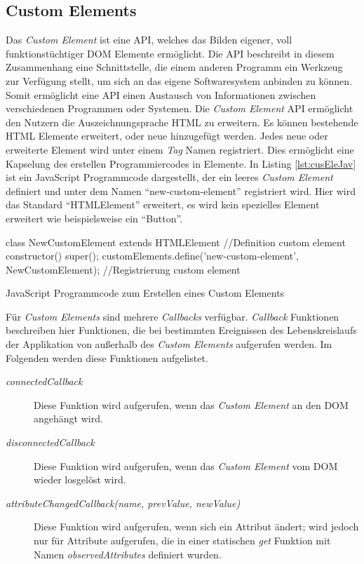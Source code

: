\documentclass[12pt, paper=a4, bibtotoc, toc=listof, headsepline=true]{scrreprt}
\begin{document}
		\subsection{Custom Elements}
		Das \emph{Custom Element} ist eine \ac{API}, welches das Bilden eigener, voll funktionstüchtiger \ac{DOM} Elemente ermöglicht\cite{Denicola2016}. Die \ac{API} beschreibt in diesem Zusammenhang eine Schnittstelle, die einem anderen Programm ein Werkzeug zur Verfügung stellt, um sich an das eigene Softwaresystem anbinden zu können\cite{Behrendt2016}. Somit ermöglicht eine \ac{API} einen Austausch von Informationen zwischen verschiedenen Programmen oder Systemen.	
		Die \emph{Custom Element} \ac{API} ermöglicht den Nutzern die Auszeichnungsprache \ac{HTML} zu erweitern\cite{Argelius2016}. Es können bestehende \ac{HTML} Elemente erweitert, oder neue hinzugefügt werden. Jedes neue oder erweiterte Element wird unter einem \emph{Tag} Namen registriert. Dies ermöglicht eine Kapselung des erstellen Programmiercodes in Elemente. In Listing \ref{lst:cusEleJav} ist ein JavaScript Programmcode dargestellt, der ein leeres \emph{Custom Element} definiert und unter dem Namen \enquote{new-custom-element} registriert wird. Hier wird das Standard \enquote{HTMLElement} erweitert, es wird kein spezielles Element erweitert wie beispielsweise ein \enquote{Button}.
		\begin{listing}
			\begin{JavaScriptcode*}{}
class NewCustomElement extends HTMLElement { //Definition custom element
	constructor() {
		super();
	}
}
customElements.define('new-custom-element', NewCustomElement); //Registrierung custom element
			\end{JavaScriptcode*}
			\caption[Erstellung Custom Element]{JavaScript Programmcode zum Erstellen eines Custom Elements}
			\label{lst:cusEleJav}
		\end{listing}
		Für \emph{Custom Elements} sind mehrere \emph{Callbacks} verfügbar. \emph{Callback} Funktionen beschreiben hier Funktionen, die bei bestimmten Ereignissen des Lebenskreislaufs der Applikation von außerhalb des \emph{Custom Elements} aufgerufen werden. Im Folgenden werden diese Funktionen aufgelistet\cite{Argelius2016}.
		\begin{description}  
			\item  [\emph{connectedCallback}] Diese Funktion wird aufgerufen, wenn das \emph{Custom Element} an den \ac{DOM} angehängt wird.			
			\item [\emph{disconnectedCallback}] Diese Funktion wird aufgerufen, wenn das \emph{Custom Element} vom \ac{DOM} wieder losgelöst wird. 			
			\item  [\emph{attributeChangedCallback(name, prevValue, newValue)}] Diese Funktion wird aufgerufen, wenn sich ein Attribut ändert; wird jedoch nur für Attribute aufgerufen, die in einer statischen \emph{get} Funktion mit Namen \emph{observedAttributes} definiert wurden.
		\end{description}
\end{document}
